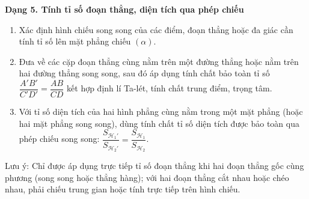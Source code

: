 \textbf{Dạng 5. Tính tỉ số đoạn thẳng, diện tích qua phép chiếu}
\begin{enumerate}
\item Xác định hình chiếu song song của các điểm, đoạn thẳng hoặc đa giác cần tính tỉ số lên mặt phẳng chiếu $(\alpha)$.
\item Đưa về các cặp đoạn thẳng cùng nằm trên một đường thẳng hoặc nằm trên hai đường thẳng song song, sau đó áp dụng tính chất bảo toàn tỉ số $\dfrac{A'B'}{C'D'} = \dfrac{AB}{CD}$ kết hợp định lí Ta-lét, tính chất trung điểm, trọng tâm.
\item Với tỉ số diện tích của hai hình phẳng cùng nằm trong một mặt phẳng (hoặc hai mặt phẳng song song), dùng tính chất tỉ số diện tích được bảo toàn qua phép chiếu song song: $\boxed{\dfrac{S_{\mathcal{H}_1'}}{S_{\mathcal{H}_2'}} = \dfrac{S_{\mathcal{H}_1}}{S_{\mathcal{H}_2}}}$.
\end{enumerate}
Lưu ý: Chỉ được áp dụng trực tiếp tỉ số đoạn thẳng khi hai đoạn thẳng gốc cùng phương (song song hoặc thẳng hàng); với hai đoạn thẳng cắt nhau hoặc chéo nhau, phải chiếu trung gian hoặc tính trực tiếp trên hình chiếu.
